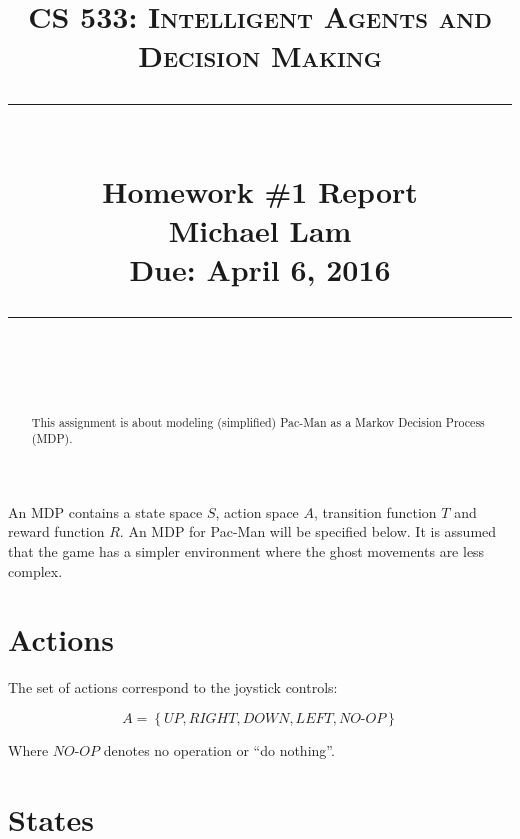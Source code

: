 \documentclass[paper=a4, fontsize=11pt]{scrartcl}
\newcommand{\lecture}{Homework \#1 Report} %
\newcommand{\lecturedate}{Due: April 6, 2016} %
\newcommand{\scribe}{Michael Lam} %
\begin{document}
\newcommand{\horrule}[1]{\rule{\linewidth}{#1}} %

\title{	
\normalfont \normalsize
\vspace{-30pt}
\textsc{CS 533: Intelligent Agents and Decision Making} \\ [10pt]
\horrule{0.5pt} \\[0.4cm] %
\LARGE \lecture\\ %
\vspace{5pt}
\normalsize \scribe\\
\lecturedate\\
\horrule{2pt} \\[0.5cm] %
}


\date{} %

\maketitle
\vspace{-100pt}

\begin{abstract}
This assignment is about modeling (simplified) Pac-Man as a Markov Decision Process (MDP).
\end{abstract}

An MDP contains a state space $S$, action space $A$, transition function $T$ and reward function $R$. An MDP for Pac-Man will be specified below. It is assumed that the game has a simpler environment where the ghost movements are less complex.

\section{Actions}

The set of actions correspond to the joystick controls:

\begin{equation}
A = \left\{\textit{UP}, \textit{RIGHT}, \textit{DOWN}, \textit{LEFT}, \textit{NO-OP} \right\}
\end{equation}

Where $\textit{NO-OP}$ denotes no operation or ``do nothing''.

\section{States}
\end{document}
